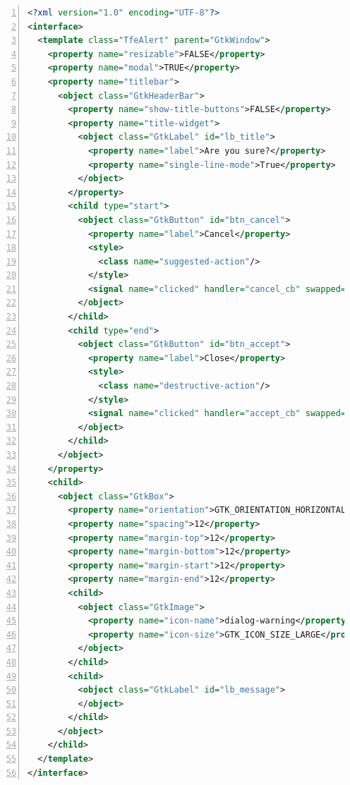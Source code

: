\begin{lstlisting}[language=XML, numbers=left]
<?xml version="1.0" encoding="UTF-8"?>
<interface>
  <template class="TfeAlert" parent="GtkWindow">
    <property name="resizable">FALSE</property>
    <property name="modal">TRUE</property>
    <property name="titlebar">
      <object class="GtkHeaderBar">
        <property name="show-title-buttons">FALSE</property>
        <property name="title-widget">
          <object class="GtkLabel" id="lb_title">
            <property name="label">Are you sure?</property>
            <property name="single-line-mode">True</property>
          </object>
        </property>
        <child type="start">
          <object class="GtkButton" id="btn_cancel">
            <property name="label">Cancel</property>
            <style>
              <class name="suggested-action"/>
            </style>
            <signal name="clicked" handler="cancel_cb" swapped="TRUE" object="TfeAlert"></signal>
          </object>
        </child>
        <child type="end">
          <object class="GtkButton" id="btn_accept">
            <property name="label">Close</property>
            <style>
              <class name="destructive-action"/>
            </style>
            <signal name="clicked" handler="accept_cb" swapped="TRUE" object="TfeAlert"></signal>
          </object>
        </child>
      </object>
    </property>
    <child>
      <object class="GtkBox">
        <property name="orientation">GTK_ORIENTATION_HORIZONTAL</property>
        <property name="spacing">12</property>
        <property name="margin-top">12</property>
        <property name="margin-bottom">12</property>
        <property name="margin-start">12</property>
        <property name="margin-end">12</property>
        <child>
          <object class="GtkImage">
            <property name="icon-name">dialog-warning</property>
            <property name="icon-size">GTK_ICON_SIZE_LARGE</property>
          </object>
        </child>
        <child>
          <object class="GtkLabel" id="lb_message">
          </object>
        </child>
      </object>
    </child>
  </template>
</interface>
\end{lstlisting}

